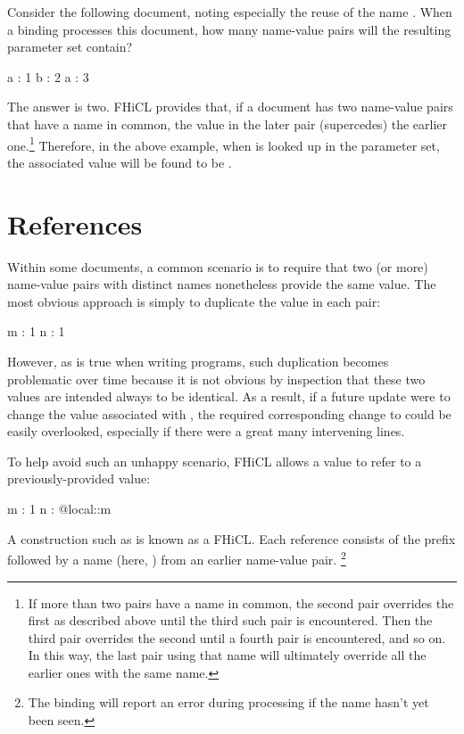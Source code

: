\documentclass{memarticle}
\newcommand{\fhicl}%
 {FHiCL\xspace}
\begin{document}
Consider the following document,
noting especially the reuse of the name .
When a binding processes this document,
how many name-value pairs
will the resulting parameter set contain?
\Needspace{0.5in}
\begin{fcllisting}[texcl,escapechar=`]
a : 1
b : 2
a : 3
\end{fcllisting}
The answer is two.
\fhicl provides that,
if a document has two name-value pairs
that have a name in common,
the value in the later pair
 (supercedes) the earlier one.\footnote{%
  If more than two pairs
  have a name in common,
  the second pair overrides the first
  as described above
  until the third such pair is encountered.
  Then the third pair overrides the second
  until a fourth pair is encountered,
  and so on.
  In this way,
  the last pair using that name
  will ultimately override all the earlier ones
  with the same name.%
}
Therefore, in the above example,
when  is looked up in the parameter set,
the associated value will be found to be .

\section{References}

Within some documents,
a common scenario
is to require that
two (or more) name-value pairs
with distinct names
nonetheless provide the same value.
The most obvious approach
is simply to duplicate the value
in each pair:
\Needspace{0.34in}
\begin{fcllisting}[texcl,escapechar=`]
m : 1
n : 1
\end{fcllisting}
However,
as is true when writing programs,
such duplication becomes problematic over time
because it is not obvious by inspection
that these two values
are intended always to be identical.
As a result,
if a future update
were to change the value associated with ,
the required corresponding change to 
could be easily overlooked,
especially if there were a great many intervening lines.

To help avoid such an unhappy scenario,
\fhicl allows a value to refer
to a previously-provided value:
\Needspace{0.34in}
\begin{fcllisting}[texcl,escapechar=`]
m : 1
n : @local::m
\end{fcllisting}
A construction such as 
is known as a \fhicl {}.
Each reference consists of the prefix 
followed by a name (here, )
from an earlier name-value pair.%
\footnote{%
  The binding will report an error during processing
  if the name hasn't yet been seen.%
}
\end{document}

